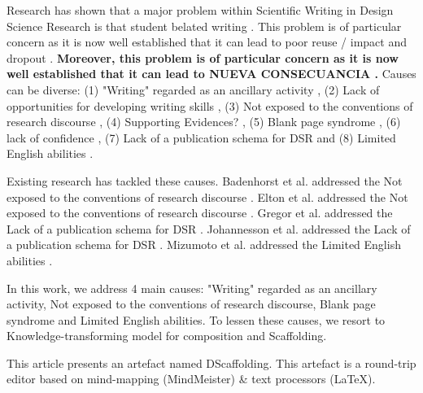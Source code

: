 \documentclass{article}
\newcommand{\todo}[1] {\iffalse #1 \fi} %
\begin{document}
Research has shown that a major problem within Scientific Writing in Design Science Research is that student belated writing \cite{Wellington2010} \cite{Badley2009} \cite{Turbek2016}. This problem is of particular concern as it is now well established that it can lead to poor reuse / impact and dropout \cite{Wellington2010} \cite{Itua2014}.\textbf{ Moreover, this problem is of particular concern as it is now well established that it can lead to NUEVA CONSECUANCIA \cite{Itua2014}. } Causes can be diverse: (1) "Writing" regarded as an ancillary activity \cite{Turbek2016} \cite{Turbek2016}, (2) Lack of opportunities for developing writing skills \cite{Cotterall2011}, (3) Not exposed to the conventions of research discourse \cite{Elton2010} \cite{Badenhorst2015} \cite{Wellington2010} \cite{Cotterall2011} \cite{Itua2014}, (4) Supporting Evidences? \cite{Hsu2004} \cite{Badenhorst2015} \cite{Badenhorst2015} \cite{Cotterall2011} \cite{Itua2014} \cite{Cameron2009} \cite{Lindsay1854}, (5) Blank page syndrome \cite{Lindsay1854} \cite{Sorensen1994} \cite{Wellington2010} \cite{Cameron2009}, (6) lack of confidence \cite{Carter2012}, (7) Lack of a publication schema for DSR \cite{Gregor2013} \cite{Gregor2013} and (8) Limited English abilities \cite{Mizumoto2017} \cite{Cotterall2011} \cite{Anthony2003}. 
    
Existing research has tackled these causes. Badenhorst et al. addressed the Not exposed to the conventions of research discourse \cite{Badenhorst2015}. Elton et al. addressed the Not exposed to the conventions of research discourse \cite{Elton2010}. Gregor et al. addressed the Lack of a publication schema for DSR \cite{Gregor2013}. Johannesson et al. addressed the Lack of a publication schema for DSR \cite{JohannessonAnIntroduction}. Mizumoto et al. addressed the Limited English abilities \cite{Mizumoto2017}. 
    
In this work, we address 4 main causes: "Writing" regarded as an ancillary activity, Not exposed to the conventions of research discourse, Blank page syndrome and Limited English abilities. To lessen these causes, we resort to Knowledge-transforming model for composition and Scaffolding. 
    
This article presents an artefact named DScaffolding. This artefact is a round-trip editor based on mind-mapping (MindMeister) & text processors (LaTeX). \todo{nueva idea}
    
\end{document}

